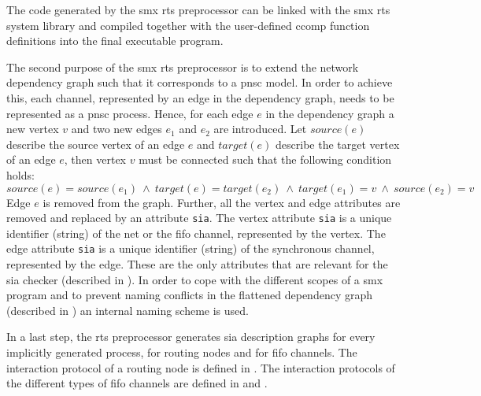 The code generated by the \gls*{smx} \gls{rts} preprocessor can be linked with the \gls*{smx} \gls{rts} system library and compiled together with the user-defined \gls*{ccomp} function definitions into the final executable program.

The second purpose of the \gls*{smx} \gls{rts} preprocessor is to extend the network dependency graph such that it corresponds to a \gls{pnsc} model.
In order to achieve this, each channel, represented by an edge in the dependency graph, needs to be represented as a \gls{pnsc} process.
Hence, for each edge $e$ in the dependency graph a new vertex $v$ and two new edges $e_1$ and $e_2$ are introduced.
Let $source(e)$ describe the source vertex of an edge $e$ and $target(e)$ describe the target vertex of an edge $e$, then vertex $v$ must be connected such that the following condition holds:
$$source(e) = source(e_1) \ \land \ target(e) = target(e_2) \ \land \ target(e_1) = v \ \land \ source(e_2) = v$$
Edge $e$ is removed from the graph.
Further, all the vertex and edge attributes are removed and replaced by an attribute \texttt{sia}.
The vertex attribute \texttt{sia} is a unique identifier (string) of the net or the \gls{fifo} channel, represented by the vertex.
The edge attribute \texttt{sia} is a unique identifier (string) of the synchronous channel, represented by the edge.
These are the only attributes that are relevant for the \gls{sia} checker (described in \Sect{\ref{sect_tool_smxsia}}).
In order to cope with the different scopes of a \gls*{smx} program and to prevent naming conflicts in the flattened dependency graph (described in \Sect{\ref{sect_tool_smxc_graph}}) an internal naming scheme is used.

In a last step, the \gls{rts} preprocessor generates \gls{sia} description graphs for every implicitly generated process, \ie for routing nodes and for \gls{fifo} channels.
The interaction protocol of a routing node is defined in \Sect{\ref{sect_smx_box_implicit_flow}}.
The interaction protocols of the different types of \gls{fifo} channels are defined in \Sect{\ref{sect_ecm_example_stream}} and \Sect{\ref{sect_cci_decoupling_sync}}.

